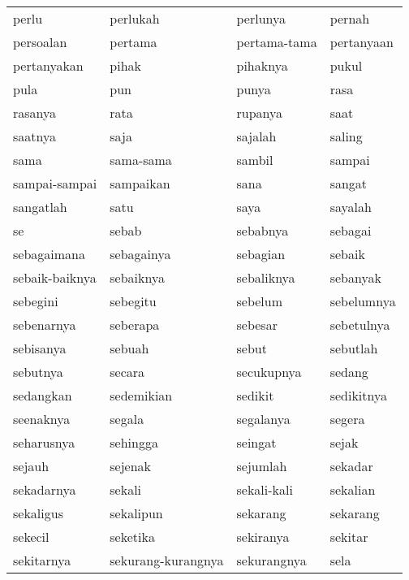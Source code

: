 \begin{tabular}{ | l | l | l | l | }
perlu & perlukah & perlunya & pernah\\
persoalan & pertama & pertama-tama & pertanyaan\\
pertanyakan & pihak & pihaknya & pukul\\
pula & pun & punya & rasa\\
rasanya & rata & rupanya & saat\\
saatnya & saja & sajalah & saling\\
sama & sama-sama & sambil & sampai\\
sampai-sampai & sampaikan & sana & sangat\\
sangatlah & satu & saya & sayalah\\
se & sebab & sebabnya & sebagai\\
sebagaimana & sebagainya & sebagian & sebaik\\
sebaik-baiknya & sebaiknya & sebaliknya & sebanyak\\
sebegini & sebegitu & sebelum & sebelumnya\\
sebenarnya & seberapa & sebesar & sebetulnya\\
sebisanya & sebuah & sebut & sebutlah\\
sebutnya & secara & secukupnya & sedang\\
sedangkan & sedemikian & sedikit & sedikitnya\\
seenaknya & segala & segalanya & segera\\
seharusnya & sehingga & seingat & sejak\\
sejauh & sejenak & sejumlah & sekadar\\
sekadarnya & sekali & sekali-kali & sekalian\\
sekaligus & sekalipun & sekarang & sekarang\\
sekecil & seketika & sekiranya & sekitar\\
sekitarnya & sekurang-kurangnya & sekurangnya & sela\\
\end{tabular}


